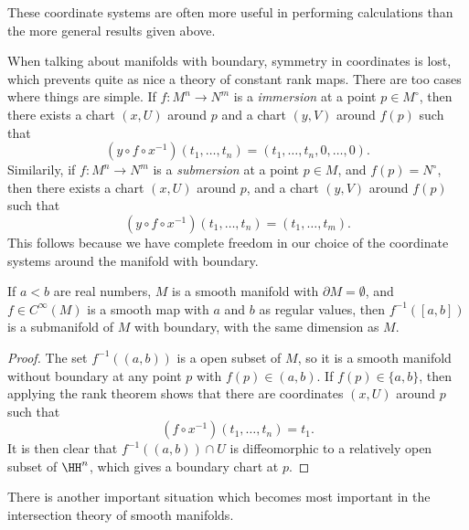 %
These coordinate systems are often more useful in performing calculations than the more general results given above.

When talking about manifolds with boundary, symmetry in coordinates is lost, which prevents quite as nice a theory of constant rank maps. There are too cases where things are simple. If $f: M^n \to N^m$ is a \emph{immersion} at a point $p \in M^\circ$, then there exists a chart $(x,U)$ around $p$ and a chart $(y,V)$ around $f(p)$ such that
%
\[ (y \circ f \circ x^{-1})(t_1, \dots, t_n) = (t_1, \dots, t_n, 0, \dots, 0). \]
%
Similarily, if $f: M^n \to N^m$ is a \emph{submersion} at a point $p \in M$, and $f(p) = N^\circ$, then there exists a chart $(x,U)$ around $p$, and a chart $(y,V)$ around $f(p)$ such that
%
\[ (y \circ f \circ x^{-1})(t_1, \dots, t_n) = (t_1, \dots, t_m). \]
%
This follows because we have complete freedom in our choice of the coordinate systems around the manifold with boundary.

\begin{theorem}
    If $a < b$ are real numbers, $M$ is a smooth manifold with $\partial M = \emptyset$, and $f \in C^\infty(M)$ is a smooth map with $a$ and $b$ as regular values, then $f^{-1}([a,b])$ is a submanifold of $M$ with boundary, with the same dimension as $M$.
\end{theorem}
\begin{proof}
    The set $f^{-1}((a,b))$ is a open subset of $M$, so it is a smooth manifold without boundary at any point $p$ with $f(p) \in (a,b)$. If $f(p) \in \{ a, b \}$, then applying the rank theorem shows that there are coordinates $(x,U)$ around $p$ such that
    \[ (f \circ x^{-1})(t_1, \dots, t_n) = t_1. \]
    It is then clear that $f^{-1}((a,b)) \cap U$ is diffeomorphic to a relatively open subset of $\HH^n$, which gives a boundary chart at $p$.
\end{proof}

There is another important situation which becomes most important in the intersection theory of smooth manifolds.

